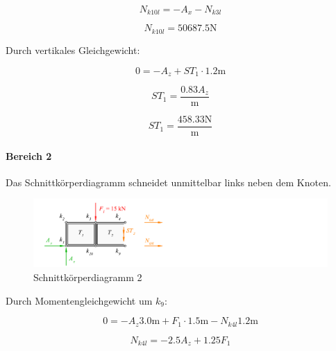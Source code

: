 \documentclass[
  12pt,
  letterpaper,
  DIV=11,
  egregdoesnotlikesansseriftitles]{scrartcl}
\let\oldparagraph\paragraph
\renewcommand{\paragraph}[1]{\oldparagraph{#1}\mbox{}}
\begin{document}
\begin{equation}N_{k10l} = - A_{x} - N_{k3l}\end{equation}

\begin{equation}N_{k10l} = 50687.5 \text{N}\end{equation}

Durch vertikales Gleichgewicht:

\begin{equation}0 = - A_{z} + ST_{1} \cdot 1.2 \text{m}\end{equation}

\begin{equation}ST_{1} = \frac{0.83 A_{z}}{\text{m}}\end{equation}

\begin{equation}ST_{1} = \frac{458.33 \text{N}}{\text{m}}\end{equation}

\hypertarget{bereich-2}{%
\paragraph{Bereich 2}\label{bereich-2}}

Das Schnittkörperdiagramm schneidet unmittelbar links neben dem Knoten.

\begin{figure}[H]

{\centering \includegraphics{BSI_HS23_Testat_03_files/mediabag/../images/Testat_03_HS23_SKD3.pdf}

}

\caption{\label{fig-skd2}Schnittkörperdiagramm 2}

\end{figure}

Durch Momentengleichgewicht um \(k_{9}\):

\begin{equation}0 = - A_{z} 3.0 \text{m} + F_{1} \cdot 1.5 \text{m} - N_{k4l} 1.2 \text{m}\end{equation}

\begin{equation}N_{k4l} = - 2.5 A_{z} + 1.25 F_{1}\end{equation}
\end{document}
